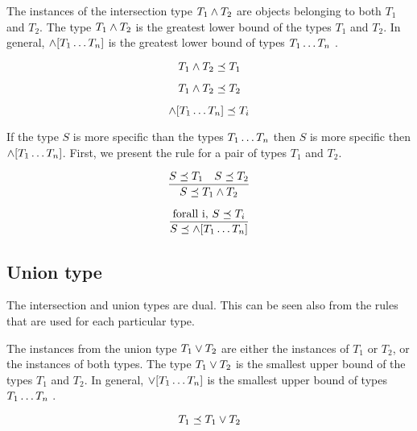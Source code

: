 \documentclass[runningheads]{llncs}
\begin{document}
The instances of the intersection type $T_1\land\/T_2$ are objects
belonging to both $T_1$ and $T_2$. The type $T_1\land\/T_2$ is the
greatest lower bound of the types $T_1$ and $T_2$. In general,
$\land[T_1\ldots\/T_n]$ is the greatest lower bound of types
$T_1\ldots\/T_n$ \cite{Pierce91IntersectUnion,Pierce96IntersectionTypes}.

\begin{equation}
T_1\land\/T_2\preceq\/T_1    
\end{equation}

\begin{equation}
T_1\land\/T_2\preceq\/T_2  
\end{equation}

\begin{equation}
\land[T_1\ldots\/T_n] \preceq\/T_i  
\end{equation}

If the type $S$ is more specific than the types $T_1\ldots\/T_n$ then
$S$ is more specific then $\land[T_1\ldots\/T_n]$. First, we present
the rule for a pair of types $T_1$ and $T_2$.

\begin{equation}
\dfrac{S\preceq\/T_1\quad\/S\preceq\/\/T_2}
      {S\preceq\/T_1\land\/T_2}  
\end{equation}

\begin{equation}
\dfrac{\text{forall i,\ } S\preceq\/T_i}
      {S\preceq\land[T_1\ldots\/T_n]}  
\end{equation}




\subsection{Union type}

The intersection and union types are dual. This can be seen also from
the rules that are used for each particular type.

The instances from the union type $T_1\lor\/T_2$ are either the
instances of $T_1$ or $T_2$, or the instances of both types. The type
$T_1\lor\/T_2$ is the smallest upper bound of the types $T_1$ and
$T_2$. In general, $\lor[T_1\ldots\/T_n]$ is the smallest upper bound
of types $T_1\ldots\/T_n$ \cite{Pierce90CalculusIntersectUnion}.

\begin{equation}
T_1\preceq\/T_1\lor\/T_2    
\end{equation}
\end{document}
